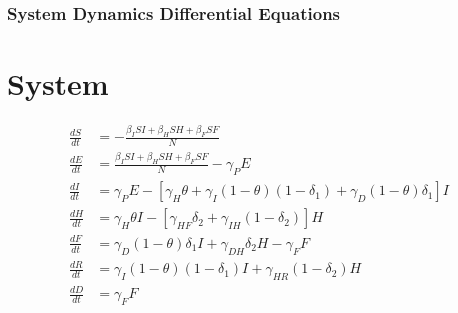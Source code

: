 \documentclass[30pt]{beamer}
\begin{document}
\begin{frame}
\frametitle{System Dynamics Differential Equations}
\section{System}
\begin{align*} 
\label{SDeqn}
\frac{dS}{dt} &= - \frac{\beta_{I}SI+\beta_{H}SH+\beta_{F}SF}{N} \\
\frac{dE}{dt} &=  \frac{\beta_{I}SI+\beta_{H}SH+\beta_{F}SF}{N}-\gamma_P E \\
\frac{dI}{dt} &=  \gamma_P E - [\gamma_{H}\theta + \gamma_{I}(1-\theta)(1-\delta_{1})+\gamma_{D}(1-\theta)\delta_{1}]I \\
\frac{dH}{dt} &= \gamma_{H}\theta I - [\gamma_{HF}\delta_{2}+\gamma_{IH}(1-\delta_{2})]H\\
\frac{dF}{dt} &= \gamma_{D}(1-\theta) \delta_{1} I + \gamma_{DH}\delta_{2} H-\gamma_{F} F \\
\frac{dR}{dt} &= \gamma_{I}(1-\theta)(1- \delta_{1}) I + \gamma_{HR}(1-\delta_{2}) H\\
\frac{dD}{dt} &= \gamma_{F} F 
\end{align*}
\end{frame}
\end{document}
